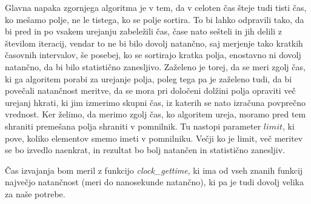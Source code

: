 \documentclass[a4paper,oneside]{article}
\begin{document}
Glavna napaka zgornjega algoritma je v tem, da v celoten čas šteje tudi tisti čas, ko
mešamo polje, ne le tistega, ko se polje sortira. To bi lahko odpravili tako, da bi pred
in po vsakem urejanju zabeležili čas, čase nato sešteli in jih delili z številom iteracij,
vendar to ne bi bilo dovolj natančno, saj merjenje tako kratkih časovnih intervalov,
še posebej, ko se sortirajo kratka polja, enostavno ni dovolj natančno, da bi bilo
statistično zanesljivo. Zaželeno je torej, da se meri zgolj čas, ki ga algoritem porabi za
urejanje polja, poleg tega pa je zaželeno tudi, da bi povečali natančnost meritve, da se mora
pri določeni dolžini polja opraviti več urejanj hkrati, ki jim izmerimo skupni čas, iz katerih se nato izračuna povprečno
vrednost. Ker želimo, da merimo zgolj čas, ko algoritem ureja, moramo pred tem shraniti
premešana polja shraniti v pomnilnik. Tu nastopi parameter $limit$, ki pove, koliko
elementov smemo imeti v pomnilniku. Večji ko je limit, več meritev se bo izvedlo naenkrat,
in rezultat bo bolj natančen in statistično zanesljiv.

Čas izvajanja bom meril z funkcijo \emph{clock\_gettime}, ki ima od vseh znanih
funkcij največjo natančnost (meri do nanosekunde natančno), ki pa je tudi dovolj
velika za naše potrebe.
\end{document}
